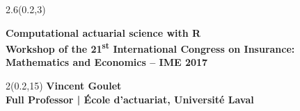 \begingroup

\textblockorigin{0mm}{0mm}
\begin{frame}[plain]
  \begin{textblock*}{2.6\TPHorizModule}(0.2\TPHorizModule,3\TPVertModule)
    \raggedright%
    \bfseries
    \fontsize{22}{22}\selectfont
    Computational actuarial science with R \\
    \mdseries
    \fontsize{12}{13}\selectfont
    Workshop of the 21\textsuperscript{st} International Congress on
    Insurance: \\ Mathematics and Economics -- IME 2017
  \end{textblock*}

  \begin{textblock*}{2\TPHorizModule}(0.2\TPHorizModule,15\TPVertModule)
    \fontsize{10}{11}\selectfont
    \bfseries
    Vincent Goulet \\
    \fontsize{9}{11}\selectfont
    \mdseries
    Full Professor | École d'actuariat, Université Laval
  \end{textblock*}
\end{frame}
\endgroup

